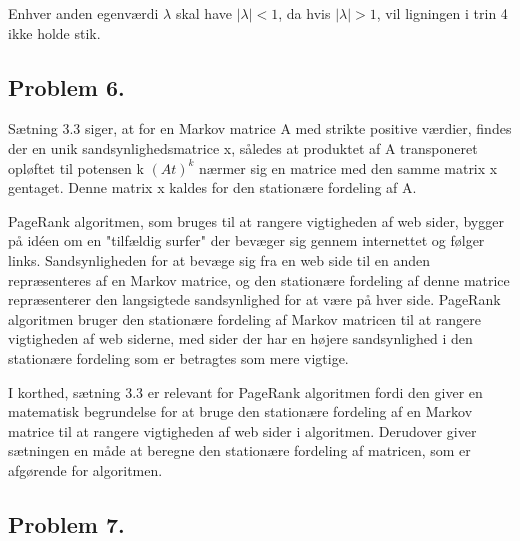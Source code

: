 Enhver anden egenværdi $\lambda$ skal have $|\lambda| < 1$, da hvis $|\lambda| > 1$, vil ligningen i trin 4 ikke holde stik.


\subsection*{Problem 6.}

Sætning 3.3 siger, at for en Markov matrice A med strikte positive værdier, findes der en unik sandsynlighedsmatrice x, således at produktet af A transponeret opløftet til potensen k $(At)^k$ nærmer sig en matrice med den samme matrix x gentaget. Denne matrix x kaldes for den stationære fordeling af A.

PageRank algoritmen, som bruges til at rangere vigtigheden af web sider, bygger på idéen om en "tilfældig surfer" der bevæger sig gennem internettet og følger links. Sandsynligheden for at bevæge sig fra en web side til en anden repræsenteres af en Markov matrice, og den stationære fordeling af denne matrice repræsenterer den langsigtede sandsynlighed for at være på hver side. PageRank algoritmen bruger den stationære fordeling af Markov matricen til at rangere vigtigheden af web siderne, med sider der har en højere sandsynlighed i den stationære fordeling som er betragtes som mere vigtige.

I korthed, sætning 3.3 er relevant for PageRank algoritmen fordi den giver en matematisk begrundelse for at bruge den stationære fordeling af en Markov matrice til at rangere vigtigheden af web sider i algoritmen. Derudover giver sætningen en måde at beregne den stationære fordeling af matricen, som er afgørende for algoritmen.

\subsection*{Problem 7.}